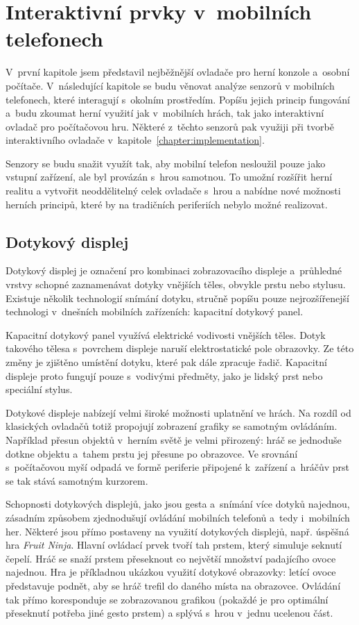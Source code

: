 \documentclass[thesis=B,czech,hidelinks]{FITthesis}[2012/06/26] %
\begin{document}
\chapter{Interaktivní prvky v~mobilních telefonech}

V~první kapitole jsem představil nejběžnější ovladače pro herní konzole a~osobní počítače. V~následující kapitole se budu věnovat analýze senzorů v mobilních telefonech, které interagují s~okolním prostředím. Popíšu jejich princip fungování a~budu zkoumat herní využití jak v~mobilních hrách, tak jako interaktivní ovladač pro počítačovou hru. Některé z~těchto senzorů pak využiji při tvorbě interaktivního ovladače v~kapitole~\ref{chapter:implementation}.

Senzory se budu snažit využít tak, aby mobilní telefon nesloužil pouze jako vstupní zařízení, ale byl provázán s~hrou samotnou. To umožní rozšířit herní realitu a vytvořit neoddělitelný celek ovladače s~hrou a nabídne nové možnosti herních principů, které by na tradičních periferiích nebylo možné realizovat.

\section{Dotykový displej}
\label{section:touchscreen}

Dotykový displej je označení pro kombinaci zobrazovacího displeje a~průhledné vrstvy schopné zaznamenávat dotyky vnějších těles, obvykle prstu nebo stylusu. Existuje několik technologií snímání dotyku, stručně popíšu pouze nejrozšířenejší technologi v~dnešních mobilních zařízeních: kapacitní dotykový panel.

Kapacitní dotykový panel využívá elektrické vodivosti vnějších těles. Dotyk takového tělesa s~povrchem displeje naruší elektrostatické pole obrazovky. Ze této změny je zjištěno umístění dotyku, které pak dále zpracuje řadič. Kapacitní displeje proto fungují pouze s~vodivými předměty, jako je lidský prst nebo speciální stylus. \cite{gray2013does}

Dotykové displeje nabízejí velmi široké možnosti uplatnění ve hrách. Na rozdíl od klasických ovladačů totiž propojují zobrazení grafiky se samotným ovládáním. Například přesun objektů v~herním světě je velmi přirozený: hráč se jednoduše dotkne objektu a~tahem prstu jej přesune po obrazovce. Ve srovnání s~počítačovou myší odpadá  ve formě periferie připojené k~zařízení a~hráčův prst se tak stává samotným kurzorem.

Schopnosti dotykových displejů, jako jsou gesta a~snímání více dotyků najednou, zásadním způsobem zjednodušují ovládání mobilních telefonů a~tedy i~mobilních her. Některé jsou přímo postaveny na využití dotykových displejů, např. úspěšná hra \textit{Fruit Ninja}\cite{fruitninja}. Hlavní ovládací prvek tvoří tah prstem, který simuluje seknutí čepelí. Hráč se snaží prstem přeseknout co největší množství padajícího ovoce najednou. Hra je příkladnou ukázkou využití dotykové obrazovky: letící ovoce představuje podnět, aby se hráč trefil do daného místa na obrazovce. Ovládání tak přímo koresponduje se zobrazovanou grafikou (pokaždé je pro optimální přeseknutí potřeba jiné gesto prstem) a splývá s~hrou v~jednu ucelenou část.
\end{document}
